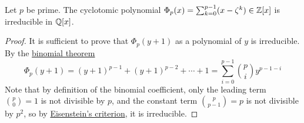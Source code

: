 \begin{corollary}
    Let \(p\) be prime.
    The cyclotomic polynomial \(\Phi_p(x) = \sum_{k=0}^{p-1} (x - \zeta^k) \in \mathbb{Z}[x]\)
    is irreducible in \(\mathbb{Q}[x]\).
\end{corollary}
\begin{proof}
    It is sufficient to prove that \(\Phi_p(y+1)\)
    as a polynomial of \(y\) is irreducible.
    By the \hyperref[prop:binom]{binomial theorem}
    \begin{equation*}
        \Phi_p(y+1) = {(y+1)}^{p-1} + {(y+1)}^{p-2} + \cdots + 1 
        = \sum_{i=0}^{p-1} \binom{p}{i} y^{p-1-i}
    \end{equation*}
    Note that by definition of the binomial coefficient,
    only the leading term \(\binom{p}{0} = 1\) is not divisible by \(p\),
    and the constant term \(\binom{p}{p-1} = p\) is not divisible by \(p^2\),
    so by \hyperref[cor:eisenstein-criterion]{Eisenstein's criterion},
    it is irreducible.
\end{proof}
